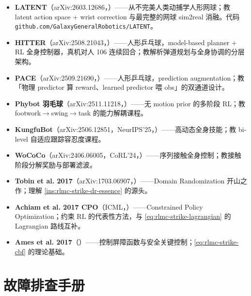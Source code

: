 \begin{itemize}
  \item \textbf{LATENT}（arXiv:2603.12686，\cite{zhang2026latent}）——从不完美人类动捕学人形网球；教 latent action space $+$ wrist correction 与最完整的网球 sim2real 消融。代码 \verb|github.com/GalaxyGeneralRobotics/LATENT|。
  \item \textbf{HITTER}（arXiv:2508.21043，\cite{he2025hitter}）——人形乒乓球，model-based planner $+$ RL 全身控制器，真机对人 106 连续回合；教解析弹道规划与全身协调的分层架构。
  \item \textbf{PACE}（arXiv:2509.21690，\cite{tennis_pace2025}）——人形乒乓球，prediction augmentation；教「物理 predictor 算 reward、learned predictor 喂 obs」的双通道设计。
  \item \textbf{Phybot 羽毛球}（arXiv:2511.11218，\cite{phybot2025badminton}）——无 motion prior 的多阶段 RL；教 footwork$\to$swing$\to$task 的能力解耦课程。
  \item \textbf{KungfuBot}（arXiv:2506.12851，NeurIPS'25，\cite{xie2025kungfubot}）——高动态全身技能；教 bi-level 自适应跟踪容忍度课程。
  \item \textbf{WoCoCo}（arXiv:2406.06005，CoRL'24，\cite{zhang2024wococo}）——序列接触全身控制；教接触阶段分解奖励与部署滤波。
  \item \textbf{Tobin et al. 2017}（arXiv:1703.06907，\cite{tobin2017domainrand}）——Domain Randomization 开山之作；理解 \cref{ins:rlmc-strike-dr-essence} 的源头。
  \item \textbf{Achiam et al. 2017 CPO}（ICML，\cite{achiam2017constrained}）——Constrained Policy Optimization；约束 RL 的代表性方法，与 \cref{eq:rlmc-strike-lagrangian} 的 Lagrangian 路线互补。
  \item \textbf{Ames et al. 2017}（\cite{ames2017cbf}）——控制屏障函数与安全关键控制；\cref{eq:rlmc-strike-cbf} 的理论基础。
\end{itemize}

\section*{故障排查手册}
\label{sec:rlmc-strike-troubleshoot}

